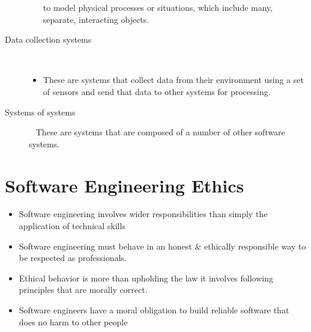\documentclass{report}
\begin{document}
\begin{description}
\begin{itemize}
to model physical processes or situations, which include many,
separate, interacting objects.
  \end{itemize}
  \item [Data collection systems] \
  \begin{itemize}
    \item These are systems that collect data from their environment using a
set of sensors and send that data to other systems for processing.
  \end{itemize}
  \item [Systems of systems] \ \newline
These are systems that are composed of a number of other software systems.
\end{description}

\section{Software Engineering Ethics}
\begin{itemize}
  \item Software engineering involves wider responsibilities than simply the application of technical skills
  \item Software engineering must behave in an honest \& ethically responsible way to be respected as professionals.
  \item Ethical behavior is more than upholding the law it involves following principles that are morally correct.
  \item Software engineers have a moral obligation to build reliable software that does no harm to other people
\end{itemize}
\end{document}
